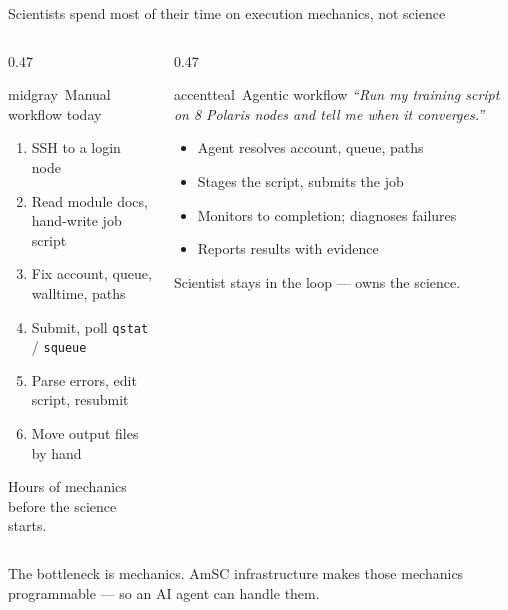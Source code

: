 \documentclass[aspectratio=169,11pt]{beamer}
\begin{document}
\begin{frame}{Scientists spend most of their time on execution mechanics, not science}
  \begin{columns}[t]
    \begin{column}{0.47\textwidth}
      \begin{featbox}{midgray}{\faTerminal\ Manual workflow today}
        \footnotesize
        \begin{enumerate}\setlength\itemsep{2pt}
          \item SSH to a login node
          \item Read module docs, hand-write job script
          \item Fix account, queue, walltime, paths
          \item Submit, poll \texttt{qstat} / \texttt{squeue}
          \item Parse errors, edit script, resubmit
          \item Move output files by hand
        \end{enumerate}
        \par\vspace{2pt}
        {\scriptsize\color{midgray}Hours of mechanics before the science starts.}
      \end{featbox}
    \end{column}
    \begin{column}{0.47\textwidth}
      \begin{featbox}{accentteal}{\faRobot\ Agentic workflow}
        \footnotesize
        \textit{``Run my training script on 8 Polaris nodes and tell me when it converges.''}
        \begin{itemize}\setlength\itemsep{2pt}
          \item Agent resolves account, queue, paths
          \item Stages the script, submits the job
          \item Monitors to completion; diagnoses failures
          \item Reports results with evidence
        \end{itemize}
        \par\vspace{2pt}
        {\scriptsize\color{accentteal}Scientist stays in the loop — owns the science.}
      \end{featbox}
    \end{column}
  \end{columns}
  \vspace{6pt}
  \begin{center}
    {\footnotesize The bottleneck is mechanics. AmSC infrastructure makes those mechanics
    programmable — so an AI agent can handle them.}
  \end{center}
\end{frame}
\end{document}
